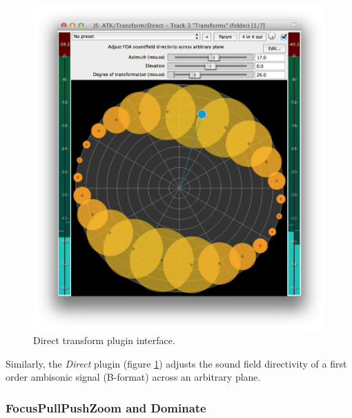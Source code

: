 \documentclass{article}
\begin{document}
\begin{figure}[h]
\captionsetup{aboveskip=-6pt}
\centering
\includegraphics[width=0.9\columnwidth]{figures/directTransform.png}
\caption{Direct transform plugin interface.\label{fig:directTransform}}
\end{figure}

Similarly, the \emph{Direct} plugin (figure \ref{fig:directTransform}) adjusts the sound field directivity of a first order ambisonic signal (B-format) across an arbitrary plane.


 
\subsubsection{FocusPullPushZoom and Dominate}\label{sec:focus}
\end{document}
